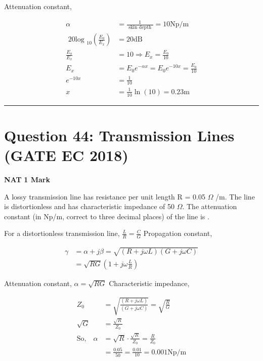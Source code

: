 \documentclass[11pt,a4paper]{article}
\begin{document}
\begin{tcolorbox}[solbox, title=Detailed Solution -- Question 43]
Attenuation constant,

\[
\begin{aligned} \alpha &=\frac{1}{\text { skin depth }}=10 \mathrm{Np} / \mathrm{m} \\ \text { 20log }_{10}\left(\frac{E_{0}}{E_{x}}\right) &=20 \mathrm{dB} \\ \frac{E_{o}}{E_{x}} &=10 \Rightarrow E_{x}=\frac{E_{0}}{10} \\ E_{x} &=E_{0} e^{-\alpha x}=E_{0} e^{-10 x}=\frac{E_{0}}{10} \\ e^{-10 x} &=\frac{1}{10} \\ x &=\frac{1}{10} \ln (10)=0.23 \mathrm{m} \end{aligned}
\]
\end{tcolorbox}

\vspace{1.5em}
\hrule
\vspace{1.5em}

\section*{Question 44: Transmission Lines (GATE EC 2018)}
\noindent \textbf{\color{primary}NAT} \hfill \textbf{\color{secondary}1 Mark}


\noindent A lossy transmission line has resistance per unit length R = 0.05 $\Omega$ /m. The line is
distortionless and has characteristic impedance of 50 $\Omega$. The attenuation constant (in Np/m, correct to three decimal places) of the line is \underline{\hspace{1.5cm}}.


\begin{tcolorbox}[solbox, title=Detailed Solution -- Question 44]
For a distortionless transmission line,
$\frac{L}{R}=\frac{C}{G}$
 Propagation constant,

\[
\begin{aligned} \gamma &=\alpha+j \beta=\sqrt{(R+j \omega L)(G+j \omega C)} \\ &=\sqrt{R G}\left(1+j \omega \frac{L}{R}\right) \end{aligned}
\]

 Attenuation constant,
$\alpha=\sqrt{R G}$
 Characteristic impedance,

\[
\begin{aligned} Z_{0} &=\sqrt{\frac{(R+j \omega L)}{(G+j \omega C)}}=\sqrt{\frac{R}{G}} \\ \sqrt{G} &=\frac{\sqrt{R}}{Z_{0}} \\ \text{So,}\quad\alpha &=\sqrt{R} \cdot \frac{\sqrt{R}}{Z_{0}}=\frac{R}{Z_{0}} \\ &=\frac{0.05}{50}=\frac{0.01}{10}=0.001 \mathrm{Np} / \mathrm{m} \end{aligned}
\]
\end{tcolorbox}
\end{document}
